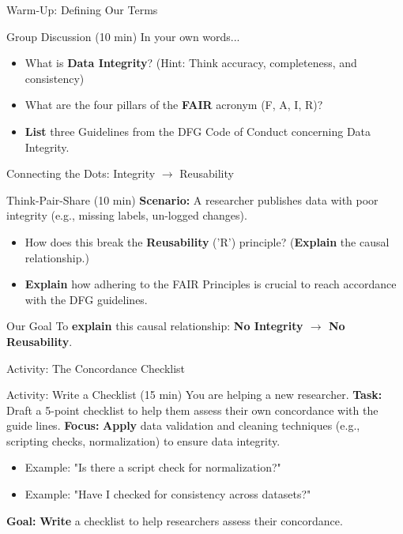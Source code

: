 \documentclass{integrity} %
\begin{document}
\begin{frame}{Warm-Up: Defining Our Terms}
    \begin{block}{Group Discussion (10 min)}
        In your own words...
        \begin{itemize}
            \item What is \textbf{Data Integrity}? \pause (Hint: Think accuracy, completeness, and consistency)
            \pause
            \item What are the four pillars of the \textbf{FAIR} acronym (F, A, I, R)?
            \pause
            \item \textbf{List} three Guidelines from the DFG Code of Conduct concerning Data Integrity.
        \end{itemize}
    \end{block}
\end{frame}

\begin{frame}{Connecting the Dots: Integrity $\rightarrow$ Reusability}
    \begin{block}{Think-Pair-Share (10 min)}
        \textbf{Scenario:} A researcher publishes data with poor integrity (e.g., missing labels, un-logged changes).
        \pause
        \begin{itemize}
            \item How does this break the \textbf{Reusability} ('R') principle? (\textbf{Explain} the causal relationship.)
            \pause
            \item \textbf{Explain} how adhering to the FAIR Principles is crucial to reach accordance with the DFG guidelines.
        \end{itemize}
    \end{block}
    \pause
    \begin{block}{Our Goal}
        To \textbf{explain} this causal relationship: \textbf{No Integrity $\rightarrow$ No Reusability}.
    \end{block}
\end{frame}

\begin{frame}{Activity: The Concordance Checklist}
    \begin{block}{Activity: Write a Checklist (15 min)}
        You are helping a new researcher.
        \pause
        \textbf{Task:} Draft a 5-point checklist to help them assess their own concordance with the guide lines.
        \pause
        \textbf{Focus:} \textbf{Apply} data validation and cleaning techniques (e.g., scripting checks, normalization) to ensure data integrity.
        \begin{itemize}
            \item \pause Example: "Is there a script check for normalization?"
            \item \pause Example: "Have I checked for consistency across datasets?"
        \end{itemize}
        \pause
        \textbf{Goal:} \textbf{Write} a checklist to help researchers assess their concordance.
    \end{block}
\end{frame}
\end{document}
